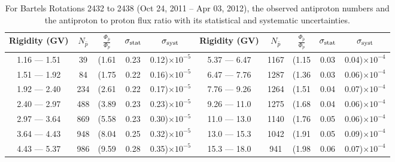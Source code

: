 \begin{table}[p] 
\renewcommand\baselinestretch{1.3}\selectfont
\setlength\tabcolsep{3pt}
\centering
\begin{tabular}{ccccc | ccccc}
\hline
\textbf{Rigidity}  (GV)  & $N_{\bar{p}}$ & $\frac{\Phi_{\bar{p}}}{\Phi_{p}}$ & $\sigma_{\rm{stat}}$ & $\sigma_{\rm{syst}}$ \hspace{1cm}   & \textbf{Rigidity}  (GV)  & $N_{\bar{p}}$ & $\frac{\Phi_{\bar{p}}}{\Phi_{p}}$ & $\sigma_{\rm{stat}}$ & $\sigma_{\rm{syst}}$ \hspace{1cm} \\ 
\hline
1.16 — 1.51   &  39                  &(1.61                          &  0.23              &      0.12)$\times 10^{-5}$  & 5.37 — 6.47                &  1167                    &(1.15                                &  0.03                   &      0.04)$\times 10^{-4}$\\
1.51 — 1.92   &  84                  &(1.75                          &  0.22              &      0.16)$\times 10^{-5}$  & 6.47 — 7.76                &  1287                    &(1.36                                &  0.03                   &      0.06)$\times 10^{-4}$\\
1.92 — 2.40   &  234                &(2.61                          &  0.22              &      0.17)$\times 10^{-5}$  & 7.76 — 9.26                &  1264                    &(1.51                                &  0.04                   &      0.07)$\times 10^{-4}$\\    
2.40 — 2.97   &  488                &(3.89                          &  0.23              &      0.23)$\times 10^{-5}$  & 9.26 — 11.0                &  1275                    &(1.68                                &  0.04                   &      0.06)$\times 10^{-4}$\\    
2.97 — 3.64   &  869                &(5.58                          &  0.23              &      0.30)$\times 10^{-5}$  & 11.0 — 13.0                 &  1140                    &(1.76                                &  0.05                   &      0.06)$\times 10^{-4}$\\
3.64 — 4.43   &  948                &(8.04                          &  0.25              &      0.32)$\times 10^{-5}$  & 13.0 — 15.3               &  1042                    &(1.91                                &  0.05                   &      0.09)$\times 10^{-4}$\\
4.43 — 5.37   &  986                &(9.59                          &  0.28              &      0.35)$\times 10^{-5}$  & 15.3 — 18.0               &  941                      &(1.98                                &  0.06                   &      0.07)$\times 10^{-4}$\\
\hline
\end{tabular}
\caption[Antiproton to proton flux ratio for Bartels Rotations 2432 to 2438]{For Bartels Rotations 2432 to 2438 (Oct 24, 2011 – Apr 03, 2012), the observed antiproton numbers and the antiproton to proton flux ratio with its statistical and systematic uncertainties.}
\label{TableOfDependent2}
\end{table}

